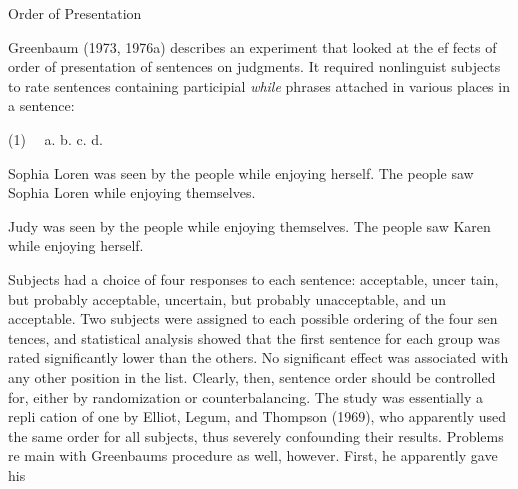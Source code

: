 \begin{styleHeadingviii}
Order of Presentation
\end{styleHeadingviii}


\begin{styleStandard}
Greenbaum (1973, 1976a) describes an experiment that looked at the ef\- fects of order of presentation of sentences on judgments. It required nonlinguist subjects to rate sentences containing participial \textit{while}\textit{ }phrases attached in various places in a sentence:
\end{styleStandard}


\begin{multicols}{2}
\begin{styleStandard}
(1) \ \ a. b. c. d.
\end{styleStandard}


\begin{styleStandard}
Sophia Loren was seen by the people while enjoying herself. The people saw Sophia Loren while enjoying themselves.
\end{styleStandard}


\begin{styleStandard}
Judy was seen by the people while enjoying themselves. The people saw Karen while enjoying herself.
\end{styleStandard}


\end{multicols}
\begin{styleStandard}
Subjects had a choice of four responses to each sentence: {\textquotedbl}acceptable,{\textquotedbl} {\textquotedbl}uncer\- tain, but probably acceptable,{\textquotedbl} {\textquotedbl}uncertain, but probably unacceptable,{\textquotedbl} and {\textquotedbl}un\- acceptable.{\textquotedbl} Two subjects were assigned to each possible ordering of the four sen\- tences, and statistical analysis showed that the first sentence for each group was rated significantly lower than the others. No significant effect was associated with any other position in the list. Clearly, then, sentence order should be controlled for, either by randomization or counterbalancing. The study was essentially a repli\- cation of one by Elliot, Legum, and Thompson (1969), who apparently used the same order for all subjects, thus severely confounding their results. Problems re\- main with Greenbaum{\textquotesingle}s procedure as well, however. First, he apparently gave his
\end{styleStandard}


